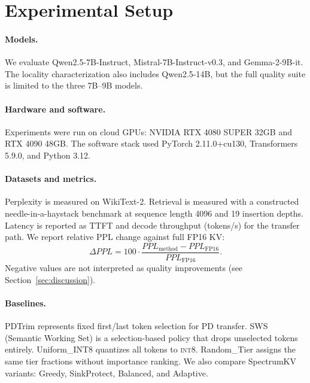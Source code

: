 \documentclass[11pt]{article}
\newcommand{\method}{SpectrumKV}
\newcommand{\ppl}{PPL}
\newcommand{\intviii}{\textsc{int8}}
\theoremstyle{plain}
\theoremstyle{definition}
\begin{document}
\section{Experimental Setup}
\label{sec:setup}

\paragraph{Models.}
We evaluate Qwen2.5-7B-Instruct, Mistral-7B-Instruct-v0.3, and Gemma-2-9B-it.  The locality characterization also includes Qwen2.5-14B, but the full quality suite is limited to the three 7B--9B models.

\paragraph{Hardware and software.}
Experiments were run on cloud GPUs: NVIDIA RTX 4080 SUPER 32GB and RTX 4090 48GB.  The software stack used PyTorch 2.11.0+cu130, Transformers 5.9.0, and Python 3.12.

\paragraph{Datasets and metrics.}
Perplexity is measured on WikiText-2.  Retrieval is measured with a constructed needle-in-a-haystack benchmark at sequence length 4096 and 19 insertion depths.  Latency is reported as TTFT and decode throughput (tokens/s) for the transfer path.  We report relative PPL change against full FP16 KV:
\begin{equation}
  \Delta \ppl = 100\cdot\frac{\ppl_{\mathrm{method}}-\ppl_{\mathrm{FP16}}}{\ppl_{\mathrm{FP16}}}.
\end{equation}
Negative values are not interpreted as quality improvements (see Section~\ref{sec:discussion}).

\paragraph{Baselines.}
PDTrim represents fixed first/last token selection for PD transfer.  SWS (Semantic Working Set) is a selection-based policy that drops unselected tokens entirely.  Uniform\_INT8 quantizes all tokens to \intviii{}.  Random\_Tier assigns the same tier fractions without importance ranking.  We also compare \method{} variants: Greedy, SinkProtect, Balanced, and Adaptive.
\end{document}
